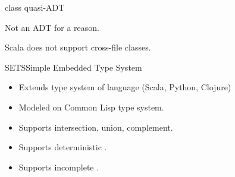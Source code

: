 \begin{frame}{ class quasi-ADT}
  \scalebox{0.8}{}

  \medskip

  Not an ADT for a  reason.

  Scala does not support cross-file  classes.
\end{frame}




\begin{frame}{SETS}{Simple Embedded Type System}

  \scalebox{1.0}{}

  \begin{itemize}
  \item   Extends type system of language (Scala, Python, Clojure)
  \item   Modeled on Common Lisp type system.
  \item   Supports intersection, union, complement.
  \item   Supports deterministic .
  \item   Supports incomplete .
  \end{itemize}
\end{frame}


